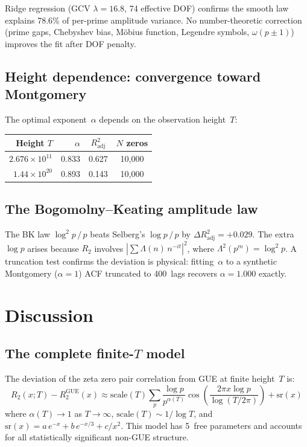 \documentclass[11pt,a4paper]{article}
\begin{document}
Ridge regression (GCV $\lambda = 16.8$, 74 effective DOF) confirms the smooth law explains 78.6\% of per-prime amplitude variance.
No number-theoretic correction (prime gaps, Chebyshev bias, M\"obius function, Legendre symbols, $\omega(p\pm 1)$) improves the fit after DOF penalty.

\subsection{Height dependence: convergence toward Montgomery}

The optimal exponent~$\alpha$ depends on the observation height~$T$:

\begin{table}[ht]
\centering
\begin{tabular}{@{}rrcc@{}}
\toprule
Height $T$ & $\alpha$ & $R^2_{\mathrm{adj}}$ & $N$ zeros \\
\midrule
$2.676 \times 10^{11}$ & 0.833 & 0.627 & 10{,}000 \\
$1.44 \times 10^{20}$  & 0.893 & 0.143 & 10{,}000 \\
\bottomrule
\end{tabular}
\end{table}

\subsection{The Bogomolny--Keating amplitude law}

The BK law $\log^2 p\,/\,p$ beats Selberg's $\log p\,/\,p$ by $\Delta R^2_{\mathrm{adj}} = +0.029$.
The extra $\log p$ arises because $R_2$ involves $|\sum \Lambda(n)\, n^{-it}|^2$, where $\Lambda^2(p^m) = \log^2 p$.
A truncation test confirms the deviation is physical: fitting~$\alpha$ to a synthetic Montgomery ($\alpha = 1$) ACF truncated to 400~lags recovers $\alpha = 1.000$ exactly.

\section{Discussion}

\subsection{The complete finite-$T$ model}

The deviation of the zeta zero pair correlation from GUE at finite height~$T$ is:
\begin{equation}\label{eq:model}
R_2(x; T) - R_2^{\mathrm{GUE}}(x) \approx \mathrm{scale}(T) \sum_p \frac{\log p}{p^{\alpha(T)}} \cos\!\left(\frac{2\pi x \log p}{\log(T/2\pi)}\right) + \mathrm{sr}(x)
\end{equation}
where $\alpha(T) \to 1$ as $T \to \infty$, $\mathrm{scale}(T) \sim 1/\log T$, and $\mathrm{sr}(x) = a\,e^{-x} + b\,e^{-x/3} + c/x^2$.
This model has 5~free parameters and accounts for all statistically significant non-GUE structure.
\end{document}
